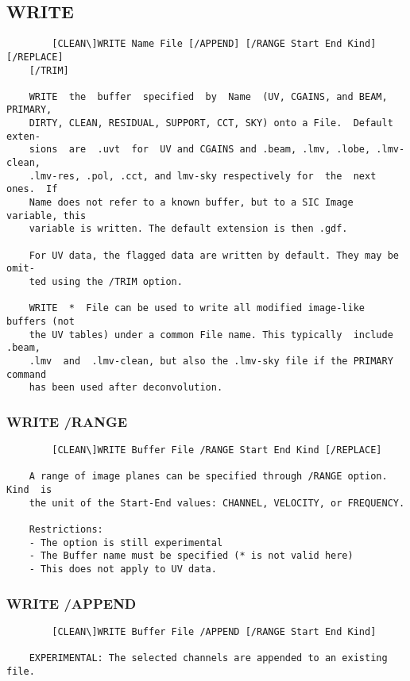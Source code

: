 \subsection{WRITE}
\begin{verbatim}
        [CLEAN\]WRITE Name File [/APPEND] [/RANGE Start End Kind] [/REPLACE]
    [/TRIM]

    WRITE  the  buffer  specified  by  Name  (UV, CGAINS, and BEAM, PRIMARY,
    DIRTY, CLEAN, RESIDUAL, SUPPORT, CCT, SKY) onto a File.  Default  exten-
    sions  are  .uvt  for  UV and CGAINS and .beam, .lmv, .lobe, .lmv-clean,
    .lmv-res, .pol, .cct, and lmv-sky respectively for  the  next  ones.  If
    Name does not refer to a known buffer, but to a SIC Image variable, this
    variable is written. The default extension is then .gdf.

    For UV data, the flagged data are written by default. They may be  omit-
    ted using the /TRIM option.

    WRITE  *  File can be used to write all modified image-like buffers (not
    the UV tables) under a common File name. This typically  include  .beam,
    .lmv  and  .lmv-clean, but also the .lmv-sky file if the PRIMARY command
    has been used after deconvolution.

\end{verbatim}
\subsubsection{WRITE /RANGE}
\begin{verbatim}
        [CLEAN\]WRITE Buffer File /RANGE Start End Kind [/REPLACE]

    A range of image planes can be specified through /RANGE option. Kind  is
    the unit of the Start-End values: CHANNEL, VELOCITY, or FREQUENCY.

    Restrictions:
    - The option is still experimental
    - The Buffer name must be specified (* is not valid here)
    - This does not apply to UV data.

\end{verbatim}
\subsubsection{WRITE /APPEND}
\begin{verbatim}
        [CLEAN\]WRITE Buffer File /APPEND [/RANGE Start End Kind]

    EXPERIMENTAL: The selected channels are appended to an existing file.

\end{verbatim}
